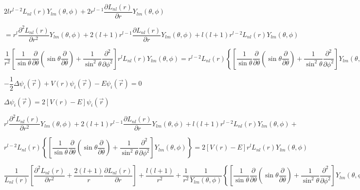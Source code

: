 \documentclass{jarticle}%
\begin{document}
$2lr^{l-2}L_{nl}\left(  r\right)  Y_{lm}\left(  \theta,\phi\right)
+2r^{l-1}\dfrac{\partial L_{nl}\left(  r\right)  }{\partial r}Y_{lm}\left(
\theta,\phi\right)  $

$=r^{l}\dfrac{\partial^{2}L_{nl}\left(  r\right)  }{\partial r^{2}}%
Y_{lm}\left(  \theta,\phi\right)  +2\left(  l+1\right)  r^{l-1}\dfrac{\partial
L_{nl}\left(  r\right)  }{\partial r}Y_{lm}\left(  \theta,\phi\right)
+l\left(  l+1\right)  r^{l-2}L_{nl}\left(  r\right)  Y_{lm}\left(  \theta
,\phi\right)  $

$\dfrac{1}{r^{2}}\left[  \dfrac{1}{\sin\theta}\dfrac{\partial}{\partial\theta
}\left(  \sin\theta\dfrac{\partial}{\partial\theta}\right)  +\dfrac{1}%
{\sin^{2}\theta}\dfrac{\partial^{2}}{\partial\phi^{2}}\right]  r^{l}%
L_{nl}\left(  r\right)  Y_{lm}\left(  \theta,\phi\right)  =r^{l-2}%
L_{nl}\left(  r\right)  \left\{  \left[  \dfrac{1}{\sin\theta}\dfrac{\partial
}{\partial\theta}\left(  \sin\theta\dfrac{\partial}{\partial\theta}\right)
+\dfrac{1}{\sin^{2}\theta}\dfrac{\partial^{2}}{\partial\phi^{2}}\right]
Y_{lm}\left(  \theta,\phi\right)  \right\}  $

$-\dfrac{1}{2}\Delta\psi_{i}\left(  \vec{r}\right)  +V\left(  r\right)
\psi_{i}\left(  \vec{r}\right)  -E\psi_{i}\left(  \vec{r}\right)  =0$

$\Delta\psi_{i}\left(  \vec{r}\right)  =2\left[  V\left(  r\right)  -E\right]
\psi_{i}\left(  \vec{r}\right)  $

$r^{l}\dfrac{\partial^{2}L_{nl}\left(  r\right)  }{\partial r^{2}}%
Y_{lm}\left(  \theta,\phi\right)  +2\left(  l+1\right)  r^{l-1}\dfrac{\partial
L_{nl}\left(  r\right)  }{\partial r}Y_{lm}\left(  \theta,\phi\right)
+l\left(  l+1\right)  r^{l-2}L_{nl}\left(  r\right)  Y_{lm}\left(  \theta
,\phi\right)  +$

$r^{l-2}L_{nl}\left(  r\right)  \left\{  \left[  \dfrac{1}{\sin\theta}%
\dfrac{\partial}{\partial\theta}\left(  \sin\theta\dfrac{\partial}%
{\partial\theta}\right)  +\dfrac{1}{\sin^{2}\theta}\dfrac{\partial^{2}%
}{\partial\phi^{2}}\right]  Y_{lm}\left(  \theta,\phi\right)  \right\}
=2\left[  V\left(  r\right)  -E\right]  r^{l}L_{nl}\left(  r\right)
Y_{lm}\left(  \theta,\phi\right)  $

$\dfrac{1}{L_{nl}\left(  r\right)  }\left[  \dfrac{\partial^{2}L_{nl}\left(
r\right)  }{\partial r^{2}}+\dfrac{2\left(  l+1\right)  }{r}\dfrac{\partial
L_{nl}\left(  r\right)  }{\partial r}\right]  +\dfrac{l\left(  l+1\right)
}{r^{2}}+\dfrac{1}{r^{2}}\dfrac{1}{Y_{lm}\left(  \theta,\phi\right)  }\left\{
\left[  \dfrac{1}{\sin\theta}\dfrac{\partial}{\partial\theta}\left(
\sin\theta\dfrac{\partial}{\partial\theta}\right)  +\dfrac{1}{\sin^{2}\theta
}\dfrac{\partial^{2}}{\partial\phi^{2}}\right]  Y_{lm}\left(  \theta
,\phi\right)  \right\}  =2\left[  V\left(  r\right)  -E\right]  $%
\end{document}
